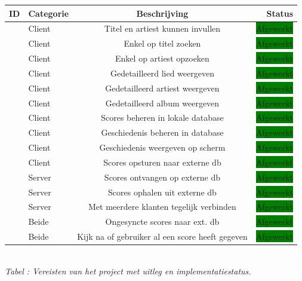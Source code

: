 \documentclass[11pt,a4paper]{article}
\newcommand{\boxgreen}{\colorbox{green}{\color{black}Afgewerkt}}
\newcommand{\boxyellow}{\colorbox{yellow}{\color{black}Aan bezig}}
\newcommand{\boxred}{\colorbox{red}{\color{black}Onafgewerkt}}
\newcounter{reqc}
\newcommand{\reqID} {%
   \stepcounter{reqc}%
   \thereqc}
\newcounter{tabc}
\newcommand{\increaseTabID} {%
   \stepcounter{tabc}%
   \thetabc}
\newcommand{\tabID}[1]{\small \textit{Tabel \increaseTabID : #1} \\ \normalsize}
\begin{document}
	\hspace{-2em} \begin{tabular}{| l | l | c | r |}
	\hline
	ID 		& 	Categorie	&	Beschrijving						& Status 		\\ \hline \hline
	\reqID	&	Client		&	Titel en artiest kunnen invullen	& \boxgreen 	\\ \hline
	\reqID 	&	Client		&	Enkel op titel zoeken				& \boxgreen		\\ \hline
	\reqID	& 	Client		&	Enkel op artiest opzoeken 			& \boxgreen		\\ \hline
	\reqID 	& 	Client		&	Gedetailleerd lied weergeven		& \boxgreen 	\\ \hline
	\reqID 	& 	Client		&	Gedetailleerd artiest weergeven		& \boxgreen 	\\ \hline
	\reqID 	& 	Client		&	Gedetailleerd album weergeven		& \boxgreen 	\\ \hline
	\reqID	& 	Client		&	Scores beheren in lokale database	& \boxgreen  	\\ \hline
	\reqID	& 	Client		&	Geschiedenis beheren in database	& \boxgreen  	\\ \hline
	\reqID	& 	Client		&	Geschiedenis weergeven op scherm	& \boxgreen  	\\ \hline
	\reqID	& 	Client		&	Scores opsturen naar externe db		& \boxgreen		\\ \hline
	\reqID	& 	Server		&	Scores ontvangen op externe db		& \boxgreen		\\ \hline
	\reqID	&	Server		&	Scores ophalen uit externe db		& \boxgreen		\\ \hline
	\reqID	& 	Server		& 	Met meerdere klanten tegelijk verbinden	& \boxgreen		\\ \hline
	\reqID	& 	Beide		& 	Ongesyncte scores naar ext. db		& \boxgreen		\\ \hline
	\reqID	&	Beide		&	Kijk na of gebruiker al een score heeft gegeven	& \boxgreen		\\ \hline
	
	\end{tabular} \\ \newline
	\tabID{Vereisten van het project met uitleg en implementatiestatus.} 
	
\end{document}
